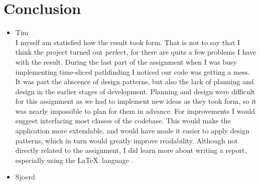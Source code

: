 \documentclass[10pt]{extarticle} %
\begin{document}
   \section {Conclusion}
   \begin{itemize}
   \item Tim\\
	I myself am statisfied how the result took form.
	That is not to say that I think the project turned out perfect, for there are quite a few problems I have with the result.
	During the last part of the assignment when I was busy implementing time-sliced pathfinding I noticed our code was getting a mess.
	It was part the abscence of design patterns, but also the lack of planning and design in the earlier stages of development.
	Planning and design were difficult for this assignment as we had to implement new ideas as they took form, so it was nearly impossible to plan for them in advance.
	For improvements I would suggest interfacing most classes of the codebase. This would make the application more extendable, and would have made it easier to apply design patterns, which in turn would greatly improve readability.
	Although not directly related to the assignment, I did learn more about writing a report, especially using the \LaTeX\ language \cite{bibmisc}\cite{textut}.
   \item Sjoerd
   
   \end{itemize}

\newpage
 
\end{document}
